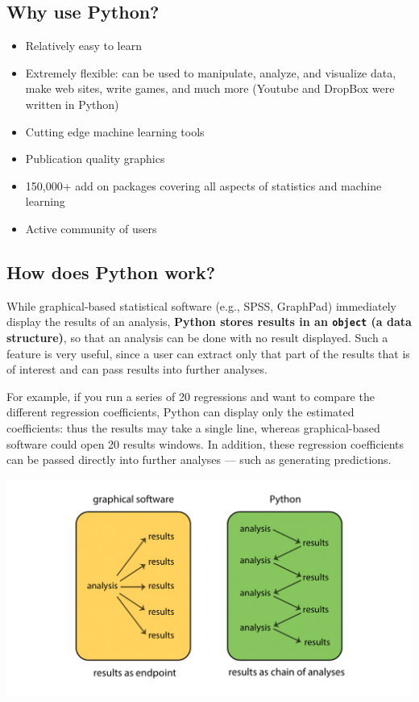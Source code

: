 \documentclass[]{book}
\providecommand{\tightlist}{%
  \setlength{\itemsep}{0pt}\setlength{\parskip}{0pt}}
\begin{document}
\hypertarget{why-use-python}{%
\subsection{Why use Python?}\label{why-use-python}}

\begin{itemize}
\tightlist
\item
  Relatively easy to learn
\item
  Extremely flexible: can be used to manipulate, analyze, and visualize data,
  make web sites, write games, and much more (Youtube and DropBox were written in Python)
\item
  Cutting edge machine learning tools
\item
  Publication quality graphics
\item
  150,000+ add on packages covering all aspects of statistics and machine learning
\item
  Active community of users
\end{itemize}

\hypertarget{how-does-python-work}{%
\subsection{How does Python work?}\label{how-does-python-work}}

While graphical-based statistical software (e.g., SPSS, GraphPad) immediately display
the results of an analysis, \textbf{Python stores results in an \texttt{object} (a data structure)},
so that an analysis can be done with no result displayed. Such a feature is very
useful, since a user can extract only that part of the results that is of interest
and can pass results into further analyses.

For example, if you run a series of 20 regressions and want to compare the
different regression coefficients, Python can display only the estimated coefficients:
thus the results may take a single line, whereas graphical-based software could
open 20 results windows. In addition, these regression coefficients can be passed
directly into further analyses --- such as generating predictions.

\includegraphics{Python/PythonIntro/images/python_chain.png}
\end{document}
